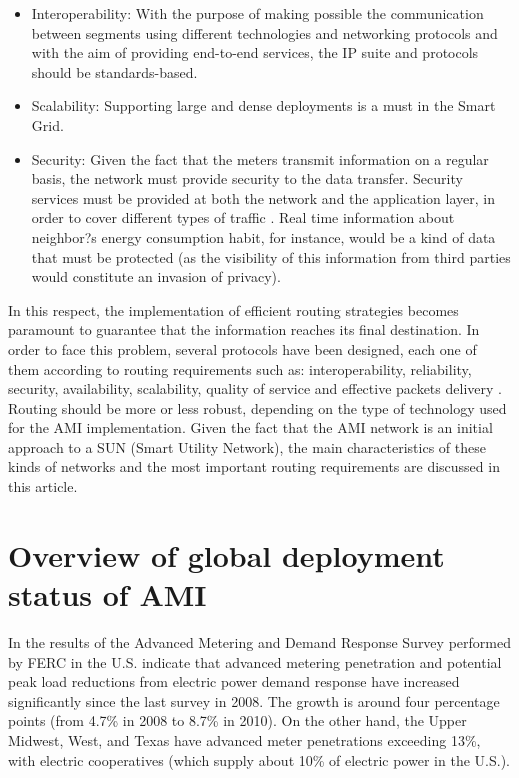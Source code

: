 \documentclass[11pt,final,onecolumn]{IEEEtran}
\begin{document}
\begin{itemize}
\item Interoperability: With the purpose of making possible the communication between segments using different technologies and networking protocols and with the aim of providing end-to-end services, the IP suite and protocols should be standards-based.
\item Scalability: Supporting large and dense deployments is a must in the Smart Grid. 
\item Security: Given the fact that the meters transmit information on a regular basis, the network must provide security to the data transfer. Security services must be provided at both the network and the application layer, in order to cover different types of traffic  \cite{Bennett2008}. Real time information about neighbor?s energy consumption habit, for instance, would be a kind of data that must be protected (as the visibility of this information from third parties would constitute an invasion of privacy).
\end{itemize}

In this respect, the implementation of efficient routing strategies becomes paramount to guarantee that the information reaches its final destination. In order to face this problem, several protocols have been designed, each one of them according to routing requirements such as: interoperability, reliability, security, availability, scalability, quality of service and effective packets delivery  \cite{Iyer2011a}. Routing should be more or less robust, depending on the type of technology used for the AMI implementation. Given the fact that the AMI network is an initial approach to a SUN (Smart Utility Network), the main characteristics of these kinds of networks and the most important routing requirements are discussed in this article. 

\section{Overview of global deployment status of AMI}\label{ami}

In \cite{FERC2012} the results of the Advanced Metering and Demand Response Survey performed by FERC in the U.S. indicate that advanced metering penetration and potential peak load reductions from electric power demand response have increased significantly since the last survey in 2008. The growth is around four percentage points (from 4.7\% in 2008 to 8.7\% in 2010). On the other hand, the Upper Midwest, West, and Texas have advanced meter penetrations exceeding 13\%, with electric cooperatives (which supply about 10\% of electric power in the U.S.). 
\end{document}
